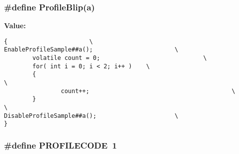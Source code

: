 \subsubsection{\setlength{\rightskip}{0pt plus 5cm}\#define Profile\-Blip(a)}\label{_mikes_profiler_8h_331f4da7f556eb8b25edda808ebf0fdb}


{\bf Value:}

\footnotesize\begin{verbatim}{                       \
EnableProfileSample##a();                       \
        volatile count = 0;                             \
        for( int i = 0; i < 2; i++ )    \
        {                                                               \
                count++;                                        \
        }                                                               \
DisableProfileSample##a();                      \
}
\end{verbatim}\normalsize 
{}
\subsubsection{\setlength{\rightskip}{0pt plus 5cm}\#define PROFILECODE~1}\label{_mikes_profiler_8h_b65527f21700539473ee357f5af033a1}



